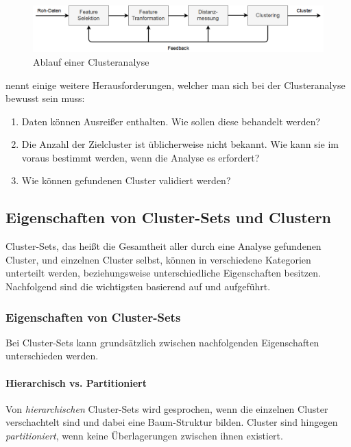 \begin{figure}[H]
    \centering
    \includegraphics[width=\linewidth]{resources/img/grundlagen/clustering_flow}
    \caption{Ablauf einer Clusteranalyse}
    \label{fig:grund_clustering_workflow}
\end{figure}

\cite[]{Jain2010} nennt einige weitere Herausforderungen, welcher man sich bei der Clusteranalyse bewusst sein muss:

\begin{enumerate}
    \item Daten können Ausreißer enthalten. Wie sollen diese behandelt werden?
    \item Die Anzahl der Zielcluster ist üblicherweise nicht bekannt. Wie kann sie im voraus bestimmt werden, wenn die Analyse es erfordert?
    \item Wie können gefundenen Cluster validiert werden?
\end{enumerate}

\subsection{Eigenschaften von Cluster-Sets und Clustern}

Cluster-Sets, das heißt die Gesamtheit aller durch eine Analyse gefundenen Cluster, und einzelnen Cluster selbst,
können in verschiedene Kategorien unterteilt werden, beziehungsweise unterschiedliche Eigenschaften besitzen.
Nachfolgend sind die wichtigsten basierend auf \cite[]{tan2007introduction} und \cite[]{Jain1999,Jain2010} aufgeführt.

\subsubsection{Eigenschaften von Cluster-Sets}

Bei Cluster-Sets kann grundsätzlich zwischen nachfolgenden Eigenschaften unterschieden werden.

\paragraph{Hierarchisch vs. Partitioniert}
Von \textit{hierarchischen} Cluster-Sets wird gesprochen, wenn die einzelnen Cluster verschachtelt sind und dabei eine
Baum-Struktur bilden. Cluster sind hingegen \textit{partitioniert}, wenn keine Überlagerungen zwischen ihnen existiert.


